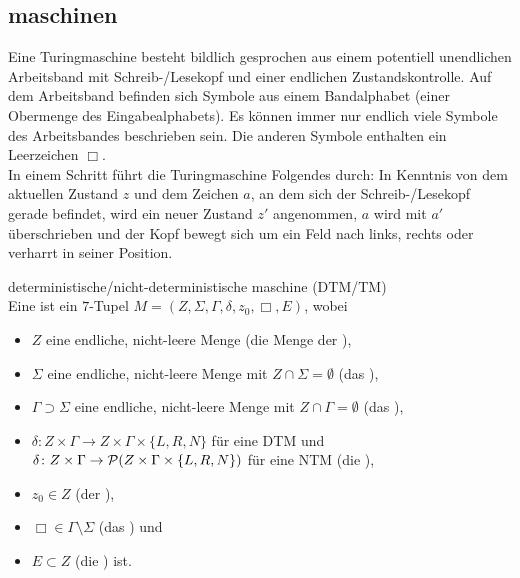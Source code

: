 \subsection{%
    maschinen%
}

\begin{Bem}
    Eine Turingmaschine besteht bildlich gesprochen aus einem potentiell
    unendlichen Arbeitsband mit Schreib-/Lesekopf und einer endlichen
    Zustandskontrolle.
    Auf dem Arbeitsband befinden sich Symbole aus einem Bandalphabet
    (einer Obermenge des Eingabealphabets).
    Es können immer nur endlich viele Symbole des Arbeitsbandes beschrieben
    sein.
    Die anderen Symbole enthalten ein Leerzeichen $\Box$.\\
    In einem Schritt führt die Turingmaschine Folgendes durch:
    In Kenntnis von dem aktuellen Zustand $z$ und dem Zeichen $a$, an dem sich
    der Schreib-/Lesekopf gerade befindet, wird ein neuer Zustand $z'$
    angenommen, $a$ wird mit $a'$ überschrieben und der Kopf bewegt sich um
    ein Feld nach links, rechts oder verharrt in seiner Position.
\end{Bem}

\linie
\pagebreak

\begin{Def}{deterministische/nicht-deterministische
            maschine (DTM/TM)}\\
    Eine 
    ist ein $7$-Tupel $M = (Z, \Sigma, \Gamma, \delta, z_0, \Box, E)$, wobei
    \begin{itemize}
        \item
        $Z$ eine endliche, nicht-leere Menge
        (die Menge der ),

        \item
        $\Sigma$ eine endliche, nicht-leere Menge
        mit $Z \cap \Sigma = \emptyset$
        (das ),

        \item
        $\Gamma \supset \Sigma$ eine endliche, nicht-leere Menge
        mit $Z \cap \Gamma = \emptyset$
        (das ),

        \item
        $\delta\colon Z \times \Gamma \rightarrow
        Z \times \Gamma \times \{L, R, N\}$ für eine DTM und\\
        $\delta\colon Z \times \Gamma \rightarrow
        \P(Z \times \Gamma \times \{L, R, N\})$ für eine NTM
        (die ),

        \item
        $z_0 \in Z$ (der ),

        \item
        $\Box \in \Gamma \setminus \Sigma$ (das ) und

        \item
        $E \subset Z$ (die ) ist.
    \end{itemize}
\end{Def}

